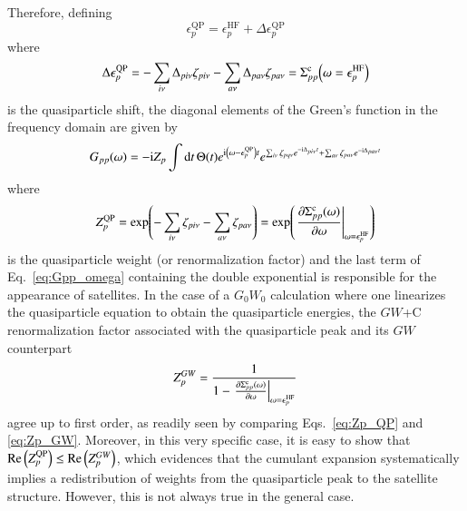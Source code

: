 \documentclass[aip,jcp,reprint,noshowkeys,superscriptaddress]{revtex4-2}
\newcommand{\HF}{\text{HF}}
\newcommand{\GW}{\text{$GW$}}
\newcommand{\co}{\text{c}}
\newcommand{\QP}{\text{QP}}
\newcommand{\eps}{\epsilon}
\newcommand{\Sig}{\Sigma}
\newcommand{\ii}{\mathrm{i}}
\begin{document}
Therefore, defining 
\begin{equation}
	\eps_p^\QP = \eps_p^\HF + \Delta\eps_p^\QP
\end{equation}
where
\begin{equation}
	\Delta\eps_p^\QP 
	= - \sum_{i\nu} \Delta_{pi\nu} \zeta_{pi\nu} - \sum_{a\nu} \Delta_{pa\nu} \zeta_{pa\nu} 
	= \Sig_{pp}^\co\qty(\omega=\eps_p^\HF)
\end{equation}
is the quasiparticle shift, the diagonal elements of the Green's function in the frequency domain are given by
\begin{equation} \label{eq:Gpp_omega}
	G_{pp}(\omega) 
	= - \ii Z_p \int \dd{t} \Theta(t) e^{\ii \qty(\omega - \eps_p^\QP) t} 
		e^{\sum_{i\nu} \zeta_{pq\nu} e^{-\ii \Delta_{pi\nu} t} + \sum_{a\nu} \zeta_{pa\nu} e^{-\ii \Delta_{pa\nu} t}}
\end{equation}
where
\begin{equation} \label{eq:Zp_QP}
	Z_p^\QP 
	= \exp(- \sum_{i\nu} \zeta_{pi\nu} - \sum_{a\nu} \zeta_{pa\nu}) 
	= \exp(\eval{\pdv{\Sig_{pp}^\co(\omega)}{\omega}}_{\omega=\eps_p^\HF})
\end{equation}
is the quasiparticle weight (or renormalization factor) and the last term of Eq.~\eqref{eq:Gpp_omega} containing the double exponential is responsible for the appearance of satellites.
In the case of a $G_0W_0$ calculation where one linearizes the quasiparticle equation to obtain the quasiparticle energies, the $GW$+C renormalization factor associated with the quasiparticle peak and its $GW$ counterpart 
\begin{equation} \label{eq:Zp_GW}
	Z_p^\GW 
	= \frac{1}{1 - \eval{\pdv{\Sig_{pp}^\co(\omega)}{\omega}}_{\omega=\eps_p^\HF}}
\end{equation}
agree up to first order, as readily seen by comparing Eqs.~\eqref{eq:Zp_QP} and \eqref{eq:Zp_GW}.
Moreover, in this very specific case, it is easy to show that $\Re\qty( Z_p^\QP ) \le \Re\qty( Z_p^\GW )$, which evidences that the cumulant expansion systematically implies a redistribution of weights from the quasiparticle peak to the satellite structure. However, this is not always true in the general case.
\end{document}
